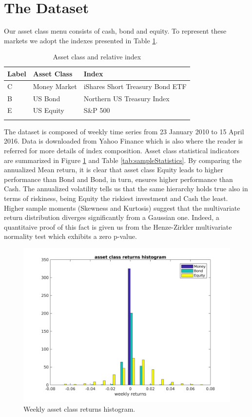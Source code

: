 \section{The Dataset}\label{sec:The_Dataset}
Our asset class menu consists of cash, bond and equity. To represent these markets we adopt the indexes presented in Table \ref{tab:indexes}.
\begin{table}[h] \label{tab:indexes}
	\centering
	\begin{tabular}{@{}lll@{}} \toprule
		Label & Asset Class & Index\\ \midrule
		C & Money Market & iShares Short Treasury Bond ETF\\
		\addlinespace[0.5em]
		B & US Bond  & Northern US Treasury Index \\
		\addlinespace[0.5em]
	    E &	US Equity &  {S\&P 500}\\ \bottomrule
		\addlinespace[0.5em]
	\end{tabular}
	\caption{Asset class and relative index}
\end{table}
The dataset is composed of weekly time series from 23 January 2010 to 15 April 2016. Data is downloaded from Yahoo Finance which is also where the reader is referred for more details of index composition. Asset class statistical indicators are summarized in Figure \ref{fig:assetclassReturns} and Table \ref{tab:sampleStatistics}. By comparing the annualized Mean return, it is clear that asset class Equity leads to higher performance than Bond and Bond, in turn, ensures higher performance than Cash. The annualized volatility tells us that the same hierarchy holds true also in terms of riskiness, being Equity the riskiest investment and Cash the least. Higher sample moments (Skewness and Kurtosis) suggest that the multivariate return distribution diverges significantly from a Gaussian one. Indeed, a quantitaive proof of this fact is given us from the Henze-Zirkler multivariate normality test which exhibits a zero p-value. 
\begin{figure}[h]\label{fig:assetclassReturns}
	\centering
	\includegraphics[scale=0.6]{Images/ReturnsHist.png}
	\caption{Weekly asset class returns histogram.}
\end{figure}
